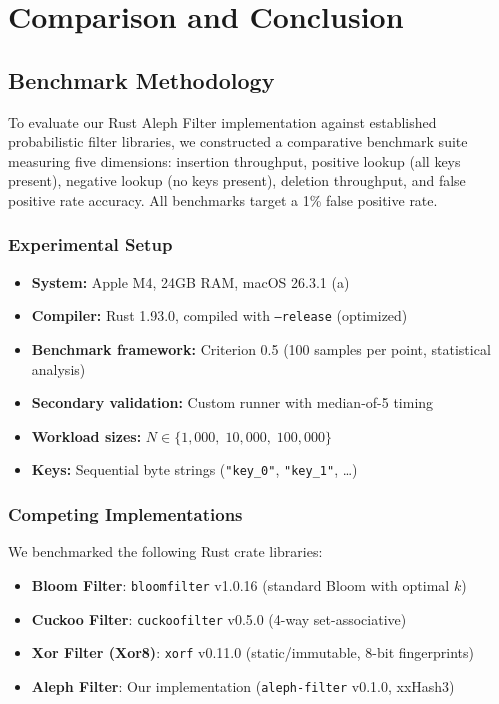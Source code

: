 \chapter{Comparison and Conclusion}

  \section{Benchmark Methodology}

  To evaluate our Rust Aleph Filter implementation against established probabilistic
  filter libraries, we constructed a comparative benchmark suite measuring five dimensions:
  insertion throughput, positive lookup (all keys present), negative lookup (no keys present),
  deletion throughput, and false positive rate accuracy. All benchmarks target a 1\% false
  positive rate.

  \subsection{Experimental Setup}

  \begin{itemize}
    \item \textbf{System:} Apple M4, 24GB RAM, macOS 26.3.1 (a)
    \item \textbf{Compiler:} Rust 1.93.0, compiled with \texttt{--release} (optimized)
    \item \textbf{Benchmark framework:} Criterion 0.5 (100 samples per point, statistical analysis)
    \item \textbf{Secondary validation:} Custom runner with median-of-5 timing
    \item \textbf{Workload sizes:} $N \in \{1{,}000,\; 10{,}000,\; 100{,}000\}$
    \item \textbf{Keys:} Sequential byte strings (\texttt{"key\_0"}, \texttt{"key\_1"}, \ldots)
  \end{itemize}

  \subsection{Competing Implementations}

  We benchmarked the following Rust crate libraries:

  \begin{itemize}
    \item \textbf{Bloom Filter}: \texttt{bloomfilter} v1.0.16 (standard Bloom with optimal $k$)
    \item \textbf{Cuckoo Filter}: \texttt{cuckoofilter} v0.5.0 (4-way set-associative)
    \item \textbf{Xor Filter (Xor8)}: \texttt{xorf} v0.11.0 (static/immutable, 8-bit fingerprints)
    \item \textbf{Aleph Filter}: Our implementation (\texttt{aleph-filter} v0.1.0, xxHash3)
  \end{itemize}

